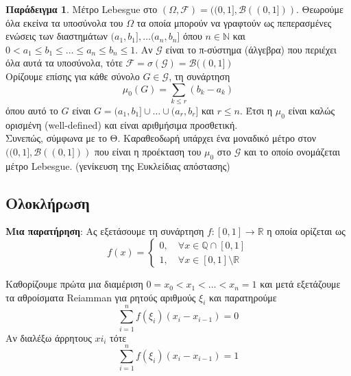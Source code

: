 \documentclass[12pt,a4paper]{article}
\theoremstyle{definition}
\numberwithin{equation}{section}
\newtheorem{paradeigma}{Παράδειγμα}
\begin{document}
\begin{paradeigma}
Μέτρο Lebesgue στο $(\Omega, \mathcal{F}) = ((0,1], \mathcal{B}( (0,1]))$. Θεωρούμε όλα εκείνα τα υποσύνολα του $\Omega$ τα οποία μπορούν
να γραφτούν ως πεπερασμένες ενώσεις των διαστημάτων $(a_1,b_1], \dots (a_n,b_n]$ όπου $n \in \mathbb{N}$ και $0 < a_1 \leq b_1 \leq \dots \leq a_n \leq b_n \leq 1$.
Αν $\mathcal{G}$ είναι το π-σύστημα (άλγεβρα) που περιέχει όλα αυτά τα υποσύνολα, τότε $\mathcal{F} = \sigma(\mathcal{G}) = \mathcal{B}((0,1])$\\

Ορίζουμε επίσης για κάθε σύνολο $G \in \mathcal{G}$, τη συνάρτηση
$$\mu_0(G) = \sum_{k\leq r} (b_k - a_k)$$
όπου αυτό το $G$ είναι $G=(a_1,b_1]\cup\dots\cup (a_r,b_r]$ και $r \leq n$. Έτσι η $\mu_0$ είναι καλώς ορισμένη (well-defined) και είναι αριθμήσιμα προσθετική.\\
Συνεπώς, σύμφωνα με το Θ. Καραθεοδωρή υπάρχει ένα μοναδικό μέτρο στον $((0,1],\mathcal{B}((0,1]))$ που είναι η προέκταση του $\mu_0$ στο $\mathcal{G}$ και το οποίο
ονομάζεται μέτρο Lebesgue. (γενίκευση της Ευκλείδιας απόστασης)
\end{paradeigma}

\subsection{Ολοκλήρωση}
\label{sec:orgd166dfb}

\textbf{Μια παρατήρηση}: Ας εξετάσουμε τη συνάρτηση \(f:[0,1]\rightarrow \mathbb{R}\) η οποία ορίζεται ως
$$ f(x) = \begin{cases} 0, \quad \forall x \in \mathbb{Q}\cap[0,1]\\
                    1, \quad \forall x \in [0,1]\setminus \mathbb{R}
                    \end{cases}$$

Καθορίζουμε πρώτα μια διαμέριση \(0=x_0<x_1<\dots <x_n=1\) και μετά εξετάζουμε τα αθροίσματα Reiamman για ρητούς αριθμούς \(\xi_i\) και παρατηρούμε
$$ \sum_{i=1}^n f(\xi_i)(x_i - x_{i-1})=0$$
Αν διαλέξω άρρητους \(xi_i\) τότε
$$ \sum_{i=1}^n f(\xi_i)(x_i - x_{i-1})=1$$
\end{document}
